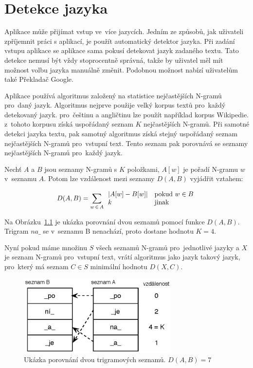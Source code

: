 \chapter{Detekce jazyka}
\label{chap:detekce}

Aplikace může přijímat vstup ve~více jazycích. Jedním ze způsobů, jak uživateli zpříjemnit práci s aplikací, je použít automatický detektor jazyka. Při zadání vstupu aplikace se aplikace sama pokusí detekovat jazyk zadaného textu. Tato detekce nemusí být vždy stoprocentně správná, takže by uživatel měl mít možnost volbu jazyka manuálně změnit. Podobnou možnost nabízí uživatelům také Překladač Google\cite{googletranslate}.

Aplikace používá algoritmus založený na statistice nejčastějších N-gramů pro~daný jazyk\cite{cavnar}. Algoritmus nejprve použije velký korpus textů pro~každý detekovaný jazyk. pro~češtinu a angličtinu lze použít například korpus Wikipedie. z~tohoto korpusu získá uspořádaný seznam $K$ nejčastějších N-gramů. Při samotné detekci jazyka textu, pak samotný algoritmus získá stejný uspořádaný seznam nejčastějších N-gramů pro~vstupní text. Tento seznam pak porovnává se seznamy nejčastějších N-gramů pro~každý jazyk.

Nechť $A$ a $B$ jsou seznamy N-gramů s $K$ položkami, $A[w]$ je pořadí N-gramu $w$ v~seznamu $A$. Potom lze vzdálenost mezi seznamy $D(A,B)$ vyjádřit vztahem:

\begin{equation}
  D(A, B) = \sum_{w\,\in\,A} \begin{array}{l l} |A[w] - B[w]| & \mathrm{pokud}\ w \in B \\
  k~& \mathrm{jinak} \end{array}
\end{equation}

Na Obrázku~\ref{fig:detekce_jazyka} je ukázka porovnání dvou seznamů pomocí funkce $D(A,B)$. Trigram $na\_$ se v~seznamu B nenachází, proto dostane hodnotu $K = 4$.

Nyní pokud máme množinu $S$ všech seznamů N-gramů pro~jednotlivé jazyky a $X$ je seznam N-gramů pro~vstupní text, vrátí algoritmus jako jazyk takový jazyk, pro~který má seznam $C \in S$ minimální hodnotu $D(X, C)$.


\begin{figure}[h]
  \centering
  \includegraphics[width=80mm]{detekce_jazyka.eps}
  \caption{Ukázka porovnání dvou trigramových seznamů. $D(A, B) = 7$}
  \label{fig:detekce_jazyka}
\end{figure}


